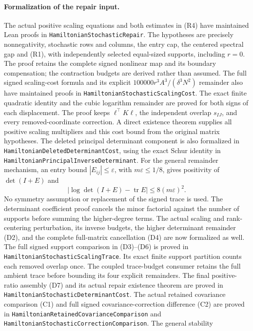 \paragraph{Formalization of the repair input.}
The actual positive scaling equations and both estimates in (R4)
have maintained Lean proofs in \texttt{HamiltonianStochasticRepair}.
The hypotheses are precisely nonnegativity, stochastic rows and columns,
the entry cap, the centered spectral gap and (R1), with independently
selected equal-sized supports, including \(r=0\).
The proof retains the complete signed nonlinear map and its boundary
compensation; the contraction budgets are derived rather than assumed.
The full signed scaling-cost formula and its explicit
\(100000r^3A^3/(\delta^3N^2)\) remainder also have maintained proofs in
\texttt{HamiltonianStochasticScalingCost}.
The exact finite quadratic identity and the cubic logarithm remainder
are proved for both signs of each displacement. The proof keeps
\(\ell^\top K\ell\), the independent overlap \(s_{IJ}\), and every
removed-coordinate correction. A direct existence theorem supplies
all positive scaling multipliers and this cost bound from the
original matrix hypotheses.
The deleted principal determinant component is also formalized in
\texttt{HamiltonianDeletedDeterminantCost}, using the exact Schur
identity in \texttt{HamiltonianPrincipalInverseDeterminant}.
For the general remainder mechanism, an entry bound
\(|E_{ij}|\leq\varepsilon\), with \(m\varepsilon\leq1/8\),
gives positivity of \(\det(I+E)\) and
\[
 |\log\det(I+E)-\operatorname{tr}E|
       \leq8(m\varepsilon)^2.
\]
No symmetry assumption or replacement of the signed trace is used.
The determinant coefficient proof cancels the minor factorial against
the number of supports before summing the higher-degree terms.
The actual scaling and rank-centering perturbation, its inverse
budgets, the higher determinant remainder (D2), and the complete
full-matrix cancellation (D4) are now formalized as well.
The full signed support comparison in (D3)--(D6) is proved in
\texttt{HamiltonianStochasticScalingTrace}. Its exact finite support
partition counts each removed overlap once. The coupled trace-budget
consumer retains the full ambient trace before bounding its four explicit
remainders. The final positive-ratio assembly (D7) and its actual repair
existence theorem are proved in
\texttt{HamiltonianStochasticDeterminantCost}.
The actual retained covariance comparison (C1) and full signed
covariance-correction difference (C2) are proved in
\texttt{HamiltonianRetainedCovarianceComparison} and
\texttt{HamiltonianStochasticCorrectionComparison}. The general stability
